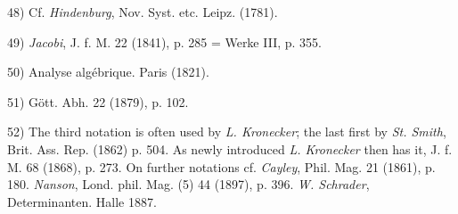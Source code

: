 \vfill
\leftline{\rule{2in}{0.4pt}}
\vspace{0.2cm}
{
\footnotesize
48) Cf. \textit{Hindenburg}, Nov. Syst. etc. Leipz. (1781).

49) \textit{Jacobi}, J. f. M. 22 (1841), p. 285 = Werke III, p. 355.

50) Analyse algébrique. Paris (1821).

51) Gött. Abh. 22 (1879), p. 102.

52) The third notation is often used by \textit{L. Kronecker}; the last first by \textit{St. Smith}, Brit. Ass. Rep. (1862) p. 504. As newly introduced \textit{L. Kronecker} then has it, J. f. M. 68 (1868), p. 273. On further notations cf. \textit{Cayley}, Phil. Mag. 21 (1861), p. 180. \textit{Nanson}, Lond. phil. Mag. (5) 44 (1897), p. 396. \textit{W. Schrader}, Determinanten. Halle 1887.

}
